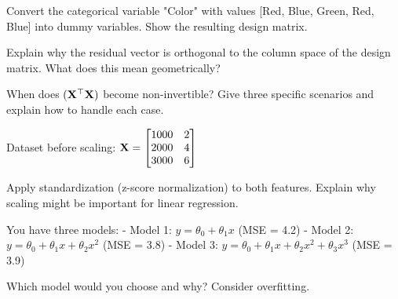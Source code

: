 \documentclass{article}
\newcounter{exercise}
\begin{document}
\begin{tcolorbox}[colback=gray!5!white,colframe=gray!75!black,title=Problem \stepcounter{exercise}: Dummy Variables]

Convert the categorical variable "Color" with values [Red, Blue, Green, Red, Blue] into dummy variables. Show the resulting design matrix.
\end{tcolorbox}

\begin{tcolorbox}[colback=gray!5!white,colframe=gray!75!black,title=Problem \stepcounter{exercise}: Geometric Interpretation]

Explain why the residual vector is orthogonal to the column space of the design matrix. What does this mean geometrically?
\end{tcolorbox}

\begin{tcolorbox}[colback=gray!5!white,colframe=gray!75!black,title=Problem \stepcounter{exercise}: Non-invertible Matrix]

When does $(\mathbf{X}^\top \mathbf{X})$ become non-invertible? Give three specific scenarios and explain how to handle each case.
\end{tcolorbox}

\begin{tcolorbox}[colback=gray!5!white,colframe=gray!75!black,title=Problem \stepcounter{exercise}: Feature Scaling]

Dataset before scaling: $\mathbf{X} = \begin{bmatrix} 1000 & 2 \\ 2000 & 4 \\ 3000 & 6 \end{bmatrix}$

Apply standardization (z-score normalization) to both features. Explain why scaling might be important for linear regression.
\end{tcolorbox}

\begin{tcolorbox}[colback=gray!5!white,colframe=gray!75!black,title=Problem \stepcounter{exercise}: Model Selection]

You have three models:
- Model 1: $y = \theta_0 + \theta_1 x$ (MSE = 4.2)
- Model 2: $y = \theta_0 + \theta_1 x + \theta_2 x^2$ (MSE = 3.8)  
- Model 3: $y = \theta_0 + \theta_1 x + \theta_2 x^2 + \theta_3 x^3$ (MSE = 3.9)

Which model would you choose and why? Consider overfitting.
\end{tcolorbox}
\end{document}
